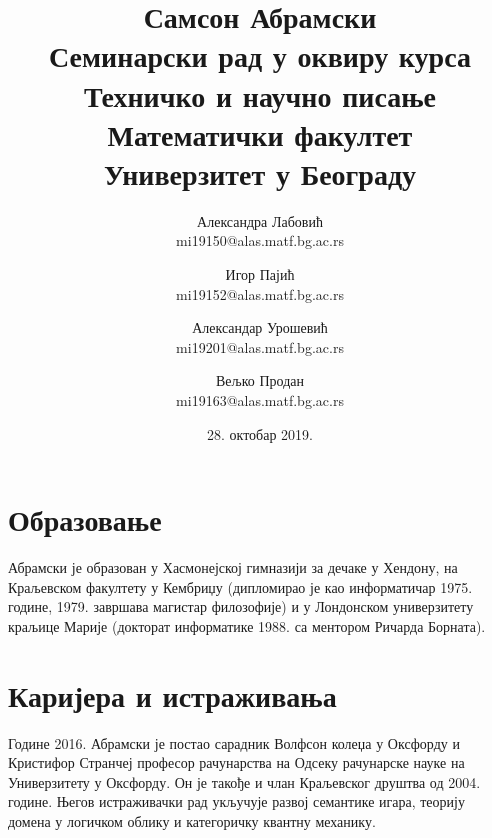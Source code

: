 \documentclass[a4paper]{article}
\begin{document}




\title{Самсон Абрамски\\ \small{Семинарски рад у оквиру курса\\Техничко и научно писање\\ Математички факултет \\ Универзитет у Београду}}

\date{28. октобар 2019.}

\author{Александра Лабовић \\ mi19150@alas.matf.bg.ac.rs \and
	Игор Пајић \\ mi19152@alas.matf.bg.ac.rs \and
	Александар Урошевић \\ mi19201@alas.matf.bg.ac.rs \and
	Вељко Продан \\ mi19163@alas.matf.bg.ac.rs }

\begin{center}
\maketitle
\end{center}


\tableofcontents

\newpage

\section{Образовање}
\label{sec:uvod}
Абрамски је образован у Хасмонејској гимназији за дечаке у Хендону, на Краљевском факултету у Кембриџу (дипломирао је као информатичар 1975. године, 1979. завршава магистар филозофије) и у Лондонском универзитету краљице Марије (докторат информатике 1988. са ментором Ричарда Борната).\cite{obr}

\section{Каријера и истраживања}
Године 2016. Абрамски је постао сарадник Волфсон колеџа у Оксфорду и Кристифор Странчеј професор рачунарства на Одсеку рачунарске науке на Универзитету у Оксфорду. Он је такође и члан Краљевског друштва од 2004. године. Његов истраживачки рад укључује развој семантике игара, теорију домена у логичком облику и категоричку квантну механику.
\end{document}
